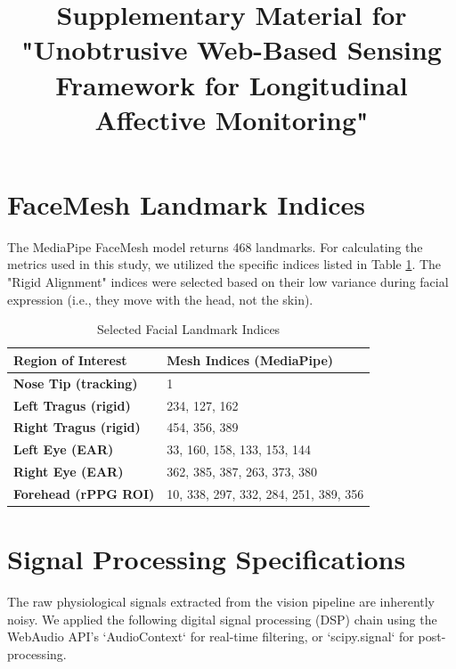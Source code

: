 \documentclass[journal]{IEEEtran}
\begin{document}
\title{Supplementary Material for "Unobtrusive Web-Based Sensing Framework for Longitudinal Affective Monitoring"}

\maketitle

\section{FaceMesh Landmark Indices}
The MediaPipe FaceMesh model returns 468 landmarks. For calculating the metrics used in this study, we utilized the specific indices listed in Table \ref{tab:landmarks}.
The "Rigid Alignment" indices were selected based on their low variance during facial expression (i.e., they move with the head, not the skin).

\begin{table}[h]
\caption{Selected Facial Landmark Indices}
\label{tab:landmarks}
\centering
\begin{tabular}{ll}
\bottomrule
\textbf{Region of Interest} & \textbf{Mesh Indices (MediaPipe)} \\ 
\toprule
\textbf{Nose Tip (tracking)} & 1 \\
\textbf{Left Tragus (rigid)} & 234, 127, 162 \\
\textbf{Right Tragus (rigid)} & 454, 356, 389 \\
\textbf{Left Eye (EAR)} & 33, 160, 158, 133, 153, 144 \\
\textbf{Right Eye (EAR)} & 362, 385, 387, 263, 373, 380 \\
\textbf{Forehead (rPPG ROI)} & 10, 338, 297, 332, 284, 251, 389, 356 \\
\bottomrule
\end{tabular}
\end{table}

\section{Signal Processing Specifications}
The raw physiological signals extracted from the vision pipeline are inherently noisy. 
We applied the following digital signal processing (DSP) chain using the WebAudio API's `AudioContext` for real-time filtering, or `scipy.signal` for post-processing.
\end{document}

